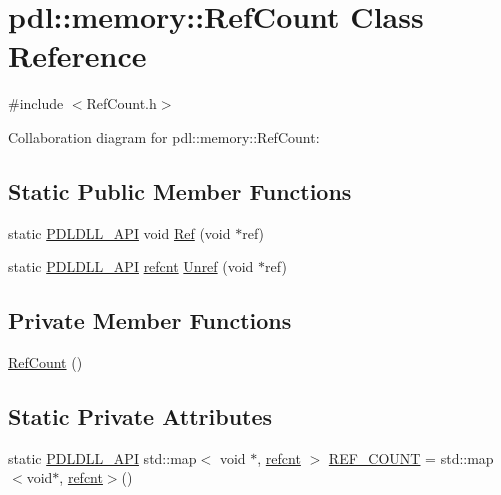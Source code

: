 \hypertarget{classpdl_1_1memory_1_1_ref_count}{}\section{pdl\+::memory\+::Ref\+Count Class Reference}
\label{classpdl_1_1memory_1_1_ref_count}


{\ttfamily \#include $<$Ref\+Count.\+h$>$}



Collaboration diagram for pdl\+::memory\+::Ref\+Count\+:
\subsection*{Static Public Member Functions}
\begin{DoxyCompactItemize}
\item 
static \mbox{\hyperlink{_p_d_core_8h_ae8c5186e53170509c65eaabab6c2c705}{P\+D\+L\+D\+L\+L\+\_\+\+A\+PI}} void \mbox{\hyperlink{classpdl_1_1memory_1_1_ref_count_abffc81485714db7707b9ce5efed24e03}{Ref}} (void $\ast$ref)
\item 
static \mbox{\hyperlink{_p_d_core_8h_ae8c5186e53170509c65eaabab6c2c705}{P\+D\+L\+D\+L\+L\+\_\+\+A\+PI}} \mbox{\hyperlink{namespacepdl_1_1memory_a45ec9ff2bed0efb7e59d152444c867af}{refcnt}} \mbox{\hyperlink{classpdl_1_1memory_1_1_ref_count_a92adccdca9a16af52899759ac2f3ad34}{Unref}} (void $\ast$ref)
\end{DoxyCompactItemize}
\subsection*{Private Member Functions}
\begin{DoxyCompactItemize}
\item 
\mbox{\hyperlink{classpdl_1_1memory_1_1_ref_count_a13c9f5d75a77a5cfd2b3a2ed5a150b14}{Ref\+Count}} ()
\end{DoxyCompactItemize}
\subsection*{Static Private Attributes}
\begin{DoxyCompactItemize}
\item 
static \mbox{\hyperlink{_p_d_core_8h_ae8c5186e53170509c65eaabab6c2c705}{P\+D\+L\+D\+L\+L\+\_\+\+A\+PI}} std\+::map$<$ void $\ast$, \mbox{\hyperlink{namespacepdl_1_1memory_a45ec9ff2bed0efb7e59d152444c867af}{refcnt}} $>$ \mbox{\hyperlink{classpdl_1_1memory_1_1_ref_count_a8c561e2af8806d40e65e477498265302}{R\+E\+F\+\_\+\+C\+O\+U\+NT}} = std\+::map$<$void$\ast$, \mbox{\hyperlink{namespacepdl_1_1memory_a45ec9ff2bed0efb7e59d152444c867af}{refcnt}}$>$()
\end{DoxyCompactItemize}


